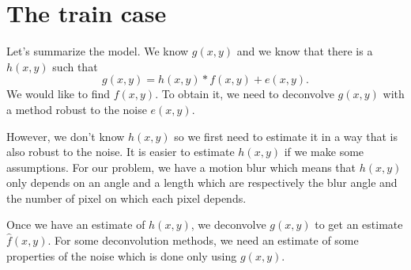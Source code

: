 \chapter{The train case} %

Let's summarize the model.
We know $g(x,y)$ and we know that there is a $h(x,y)$ such that
\[ g(x,y) = h(x,y) * f(x,y) + e(x,y). \]
We would like to find $f(x,y)$.
To obtain it, we need to deconvolve $g(x,y)$ with a method
robust to the noise $e(x,y)$.

However, we don't know $h(x,y)$ so we first need to estimate it
in a way that is also robust to the noise.
It is easier to estimate $h(x,y)$ if we make some assumptions.
For our problem, we have a motion blur which means that
$h(x,y)$ only depends on an angle and a length which are
respectively the blur angle and the number of
pixel on which each pixel depends.

Once we have an estimate of $h(x,y)$, we deconvolve
$g(x,y)$ to get an estimate $\hat{f}(x,y)$.
For some deconvolution methods, we need an estimate of
some properties of the noise which is done only using $g(x,y)$.




